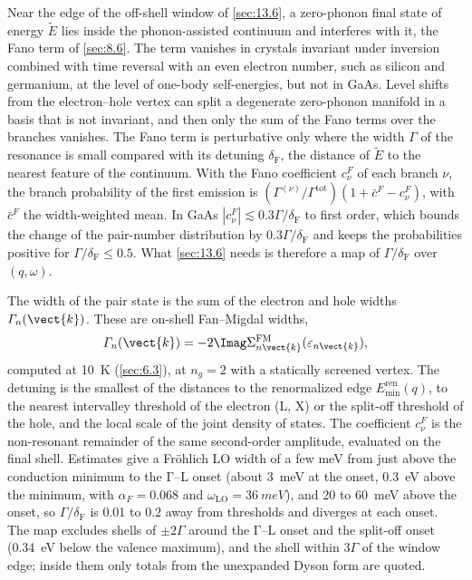 Near the edge of the off-shell window of \cref{sec:13.6}, a zero-phonon final state of energy $\tilde E$ lies inside the phonon-assisted continuum and interferes with it, the Fano term of \cref{sec:8.6}. The term vanishes in crystals invariant under inversion combined with time reversal with an even electron number, such as silicon and germanium, at the level of one-body self-energies, but not in GaAs. Level shifts from the electron--hole vertex can split a degenerate zero-phonon manifold in a basis that is not invariant, and then only the sum of the Fano terms over the branches vanishes. The Fano term is perturbative only where the width $\varGamma$ of the resonance is small compared with its detuning $\delta_{\mathrm{F}}$, the distance of $\tilde E$ to the nearest feature of the continuum. With the Fano coefficient $c^F_\nu$ of each branch $\nu$, the branch probability of the first emission is $(\varGamma^{(\nu)}/\varGamma^{\mathrm{tot}})(1 + \bar c^F - c^F_\nu)$, with $\bar c^F$ the width-weighted mean. In GaAs $|c^F_\nu| \lesssim 0.3\varGamma/\delta_{\mathrm{F}}$ to first order, which bounds the change of the pair-number distribution by $0.3\varGamma/\delta_{\mathrm{F}}$ and keeps the probabilities positive for $\varGamma/\delta_{\mathrm{F}} \le 0.5$. What \cref{sec:13.6} needs is therefore a map of $\varGamma/\delta_{\mathrm{F}}$ over $(q,\omega)$.

The width of the pair state is the sum of the electron and hole widths $\varGamma_n(\vect{k})$. These are on-shell Fan--Migdal widths,
\begin{equation*}
  \varGamma_n(\vect{k}) = -2\Imag\Sigma^{\mathrm{FM}}_{n\vect{k}}(\varepsilon_{n\vect{k}}) ,
\end{equation*}
computed at \SI{10}{K} (\cref{sec:6.3}), at $n_g = 2$ with a statically screened vertex. The detuning is the smallest of the distances to the renormalized edge $E_{\min}^{\mathrm{ren}}(q)$, to the nearest intervalley threshold of the electron (L, X) or the split-off threshold of the hole, and the local scale of the joint density of states. The coefficient $c^F_\nu$ is the non-resonant remainder of the same second-order amplitude, evaluated on the final shell. Estimates give a Fr\"ohlich LO width of a few meV from just above the conduction minimum to the $\mathrm{\Gamma}$--L onset (about \SI{3}{meV} at the onset, \SI{0.3}{eV} above the minimum, with $\alpha_F = 0.068$ and $\omega_{\mathrm{LO}} = \SI{36}{meV}$), and 20 to \SI{60}{meV} above the onset, so $\varGamma/\delta_{\mathrm{F}}$ is 0.01 to 0.2 away from thresholds and diverges at each onset. The map excludes shells of $\pm2\varGamma$ around the $\mathrm{\Gamma}$--L onset and the split-off onset (\SI{0.34}{eV} below the valence maximum), and the shell within $3\varGamma$ of the window edge; inside them only totals from the unexpanded Dyson form are quoted.

